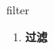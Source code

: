
\begin{frame}
{\huge filter}
\begin{center}
\begin{enumerate}\Large
  \item \textbf{过滤}
\end{enumerate}
\end{center}
\end{frame}
